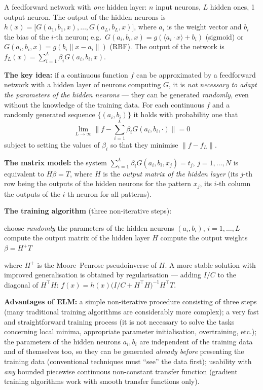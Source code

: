 \documentclass[11pt,a4paper]{article}
\theoremstyle{definition}
\providecommand{\uv}[1]{``#1''}
\begin{document}
\begin{defbox}
A feedforward network with \emph{one} hidden layer: $n$ input neurons, $L$ hidden ones, 1 output
neuron. The output of the hidden neurons is $h(x)=\big[G(a_1,b_1,x),\dots,G(a_L,b_L,x)\big]$,
where $a_i$ is the weight vector and $b_i$ the bias of the $i$-th neuron; e.g.\
$G(a_i,b_i,x)=g(\langle a_i\cdot x\rangle+b_i)$ (sigmoid) or
$G(a_i,b_i,x)=g(b_i\|x-a_i\|)$ (RBF). The output of the network is
$f_L(x)=\sum_{i=1}^{L}\beta_iG(a_i,b_i,x)$.

\textbf{The key idea:} if a continuous function $f$ can be approximated by a feedforward network
with a hidden layer of neurons computing $G$, it is \emph{not necessary to adapt the parameters of
the hidden neurons} --- they can be generated \emph{randomly}, even without the knowledge of the
training data. For each continuous $f$ and a randomly generated sequence $\{(a_i,b_i)\}$ it holds
with probability one that
\[ \lim_{L\to\infty}\Big\|f-\textstyle\sum_{i=1}^{L}\beta_iG(a_i,b_i,\cdot)\Big\|=0 \]
subject to setting the values of $\beta_i$ so that they minimise $\|f-f_L\|$.

\textbf{The matrix model:} the system $\sum_{i=1}^{L}\beta_iG(a_i,b_i,x_j)=t_j$,
$j=1,\dots,N$ is equivalent to $H\beta=T$, where $H$ is the \emph{output matrix of the hidden
layer} (its $j$-th row being the outputs of the hidden neurons for the pattern $x_j$, its $i$-th
column the outputs of the $i$-th neuron for all patterns).

\textbf{The training algorithm} (three non-iterative steps):
\begin{algorithmic}[1]
\State choose \emph{randomly} the parameters of the hidden neurons $(a_i,b_i)$, $i=1,\dots,L$
\State compute the output matrix of the hidden layer $H$
\State compute the output weights $\beta=H^{+}T$
\end{algorithmic}
where $H^{+}$ is the Moore--Penrose pseudoinverse of $H$. A more stable solution with improved
generalisation is obtained by regularisation --- adding $I/C$ to the diagonal of
$H^{\!\top}H$: $f(x)=h(x)\big(I/C+H^{\!\top}H\big)^{-1}H^{\!\top}T$.
\end{defbox}

\textbf{Advantages of ELM:} a simple non-iterative procedure consisting of three steps (many
traditional training algorithms are considerably more complex); a very fast and straightforward
training process (it is not necessary to solve the tasks concerning local minima, appropriate
parameter initialisation, overtraining, etc.); the parameters of the hidden neurons $a_i,b_i$ are
independent of the training data and of themselves too, so they can be generated \emph{already
before} presenting the training data (conventional techniques must \uv{see} the data first);
usability with \emph{any} bounded piecewise continuous non-constant transfer function (gradient
training algorithms work with smooth transfer functions only).
\end{document}
